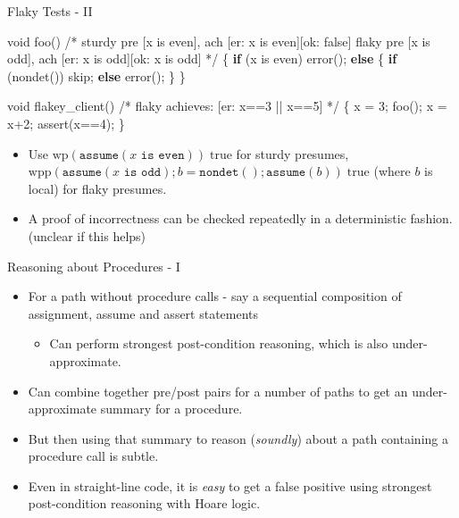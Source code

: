 \documentclass[
  10pt,
  ignorenonframetext,
]{beamer}
\newenvironment{Shaded}{\begin{snugshade}}{\end{snugshade}}
\newcommand{\CommentTok}[1]{\textcolor[rgb]{0.48,0.49,0.49}{#1}}
\newcommand{\ControlFlowTok}[1]{\textcolor[rgb]{0.99,0.74,0.29}{\textbf{#1}}}
\newcommand{\DataTypeTok}[1]{\textcolor[rgb]{0.16,0.50,0.73}{#1}}
\newcommand{\DecValTok}[1]{\textcolor[rgb]{0.96,0.45,0.00}{#1}}
\newcommand{\NormalTok}[1]{\textcolor[rgb]{0.81,0.81,0.76}{#1}}
\newcommand{\OperatorTok}[1]{\textcolor[rgb]{0.81,0.81,0.76}{#1}}
\providecommand{\tightlist}{%
  \setlength{\itemsep}{0pt}\setlength{\parskip}{0pt}}
\newcommand{\true}{\mathrm{true}}
\newcommand{\Wp}{\mathrm{wp}}
\newcommand{\Wpp}{\mathrm{wpp}}
\newcommand{\Assume}{\texttt{assume}}
\begin{document}
\begin{frame}[fragile]{Flaky Tests - II}
\label{flaky-tests---ii}
\begin{Shaded}
\begin{Highlighting}[]
\DataTypeTok{void}\NormalTok{ foo}\OperatorTok{()}
\CommentTok{/* sturdy pre [x is even], ach [er: x is even][ok: false]}
\CommentTok{    flaky pre [x is odd], ach [er: x is odd][ok: x is odd] */}
\OperatorTok{\{}
    \ControlFlowTok{if} \OperatorTok{(}\NormalTok{x is even}\OperatorTok{)}\NormalTok{ error}\OperatorTok{();}
    \ControlFlowTok{else} \OperatorTok{\{} \ControlFlowTok{if} \OperatorTok{(}\NormalTok{nondet}\OperatorTok{())}\NormalTok{ skip}\OperatorTok{;} \ControlFlowTok{else}\NormalTok{ error}\OperatorTok{();} \OperatorTok{\}}
\OperatorTok{\}}

\DataTypeTok{void}\NormalTok{ flakey\_client}\OperatorTok{()}
\CommentTok{/* flaky achieves: [er: x==3 || x==5] */}
\OperatorTok{\{}\NormalTok{   x }\OperatorTok{=} \DecValTok{3}\OperatorTok{;}
\NormalTok{    foo}\OperatorTok{();}
\NormalTok{    x }\OperatorTok{=}\NormalTok{ x}\OperatorTok{+}\DecValTok{2}\OperatorTok{;}
\NormalTok{    assert}\OperatorTok{(}\NormalTok{x}\OperatorTok{==}\DecValTok{4}\OperatorTok{);}
\OperatorTok{\}}
\end{Highlighting}
\end{Shaded}

\begin{itemize}
\item
  Use \(\Wp(\Assume (x \texttt{ is even})) \; \true\) for sturdy
  presumes,
  \(\Wpp(\Assume(x \texttt{ is odd}); b=\texttt{nondet}(); \Assume ( b )) \; \true\)
  (where \(b\) is local) for flaky presumes.
\item
  A proof of incorrectness can be checked repeatedly in a deterministic
  fashion. (unclear if this helps)
\end{itemize}
\end{frame}

\begin{frame}{Reasoning about Procedures - I}
\label{reasoning-about-procedures---i}
\begin{itemize}
\item
  For a path without procedure calls - say a sequential composition of
  assignment, assume and assert statements

  \begin{itemize}
  \tightlist
  \item
    Can perform strongest post-condition reasoning, which is also
    under-approximate.
  \end{itemize}
\item
  Can combine together pre/post pairs for a number of paths to get an
  under-approximate summary for a procedure.
\item
  But then using that summary to reason (\emph{soundly}) about a path
  containing a procedure call is subtle.
\item
  Even in straight-line code, it is \emph{easy} to get a false positive
  using strongest post-condition reasoning with Hoare logic.
\end{itemize}
\end{frame}
\end{document}

